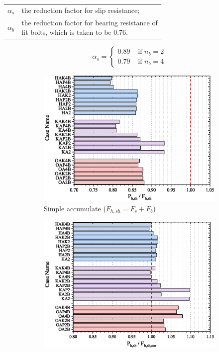 \begin{tabular}{ll}
$\alpha_s$ & the reduction factor for slip resistance;\\
$\alpha_b$ & \makecell[l]{the reduction factor for bearing resistance of \\ fit bolts, which is taken to be 0.76.}
\end{tabular}

\begin{equation}
\alpha_s =
\begin{cases} 
0.89 & \text { if } n_b = 2 \\ 
0.79 & \text { if } n_b = 4
\end{cases}
\label{eq-as}
\end{equation}


\begin{figure}
    \centering
    \begin{subfigure}[b]{0.48\textwidth}
        \includegraphics[width=\linewidth]{imgs/ch7/RF-total.eps}
        \caption{Simple accumulate ($F_{h,sh}=F_s+F_b$)}
        \label{fig-fhv}
    \end{subfigure}
    \hfill
    \begin{subfigure}[b]{0.48\textwidth}
        \includegraphics[width=\linewidth]{imgs/ch7/RF-total-cor.eps}

\end{subfigure}
\end{figure}
